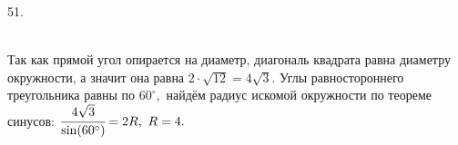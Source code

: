 51. \begin{figure}[ht!]
\end{figure}\\
Так как прямой угол опирается на диаметр, диагональ квадрата равна диаметру окружности, а значит она равна $2\cdot\sqrt{12}=4\sqrt{3}.$ Углы равностороннего треугольника равны по $60^\circ,$ найдём радиус искомой окружности по теореме синусов: $\cfrac{4\sqrt{3}}{\sin(60^\circ)}=2R,\ R=4.$\newpage\noindent
